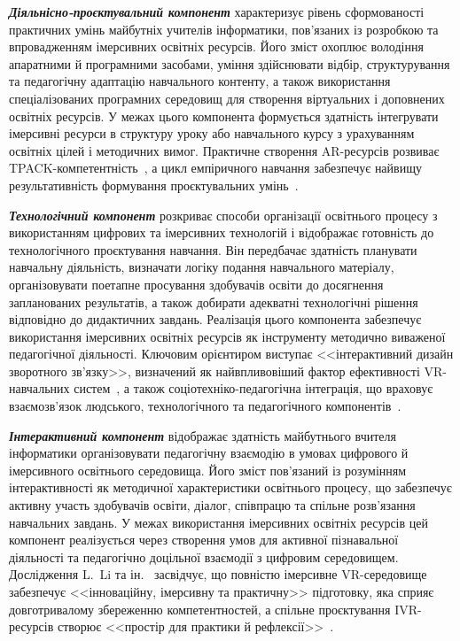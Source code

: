 \emph{\textbf{Діяльнісно-проєктувальний компонент}} характеризує рівень сформованості практичних умінь майбутніх учителів інформатики, пов'язаних із розробкою та впровадженням імерсивних освітніх ресурсів. Його зміст охоплює володіння апаратними й програмними засобами, уміння здійснювати відбір, структурування та педагогічну адаптацію навчального контенту, а також використання спеціалізованих програмних середовищ для створення віртуальних і доповнених освітніх ресурсів. У межах цього компонента формується здатність інтегрувати імерсивні ресурси в структуру уроку або навчального курсу з урахуванням освітніх цілей і методичних вимог. Практичне створення AR-ресурсів розвиває TPACK-компетентність~\cite{BeldaMedina2022TPACK}, а цикл емпіричного навчання забезпечує найвищу результативність формування проєктувальних умінь~\cite{Kee2023Experiential}.

\emph{\textbf{Технологічний компонент}} розкриває способи організації освітнього процесу з використанням цифрових та імерсивних технологій і відображає готовність до технологічного проєктування навчання. Він передбачає здатність планувати навчальну діяльність, визначати логіку подання навчального матеріалу, організовувати поетапне просування здобувачів освіти до досягнення запланованих результатів, а також добирати адекватні технологічні рішення відповідно до дидактичних завдань. Реалізація цього компонента забезпечує використання імерсивних освітніх ресурсів як інструменту методично виваженої педагогічної діяльності. Ключовим орієнтиром виступає <<інтерактивний дизайн зворотного зв'язку>>, визначений як найвпливовіший фактор ефективності VR-навчальних систем~\cite{Li2024ADDIE}, а також соціотехніко-педагогічна інтеграція, що враховує взаємозв'язок людського, технологічного та педагогічного компонентів~\cite{Schmidt2024EntangledLXD}.

\emph{\textbf{Інтерактивний компонент}} відображає здатність майбутнього вчителя інформатики організовувати педагогічну взаємодію в умовах цифрового й імерсивного освітнього середовища. Його зміст пов'язаний із розумінням інтерактивності як методичної характеристики освітнього процесу, що забезпечує активну участь здобувачів освіти, діалог, співпрацю та спільне розв'язання навчальних завдань. У межах використання імерсивних освітніх ресурсів цей компонент реалізується через створення умов для активної пізнавальної діяльності та педагогічно доцільної взаємодії з цифровим середовищем. Дослідження L.~Li та ін.~\cite{Li2024ClassMasterIVR} засвідчує, що повністю імерсивне VR-середовище забезпечує <<інноваційну, імерсивну та практичну>> підготовку, яка сприяє довготривалому збереженню компетентностей, а спільне проєктування IVR-ресурсів створює <<простір для практики й рефлексії>>~\cite{Paulsen2024CollaborativeIVR}.

